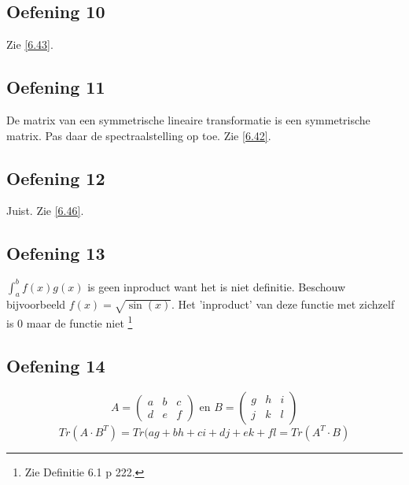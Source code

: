 \documentclass[lineaire_algebra_oplossingen.tex]{subfiles}
\begin{document}
\subsection{Oefening 10}
Zie \ref{6.43}.

\subsection{Oefening 11}
De matrix van een symmetrische lineaire transformatie is een symmetrische matrix. Pas daar de spectraalstelling op toe. Zie \ref{6.42}.

\subsection{Oefening 12}
Juist. Zie \ref{6.46}.

\subsection{Oefening 13}
$\int_a^bf(x)g(x)$ is geen inproduct want het is niet definitie. Beschouw bijvoorbeeld $f(x) = \sqrt{\sin(x)}$. Het 'inproduct' van deze functie met zichzelf is $0$ maar de functie niet \footnote{Zie Definitie 6.1 p 222.}

\subsection{Oefening 14}
\[
A = 
\begin{pmatrix}
a & b & c\\
d & e & f
\end{pmatrix}
\text{ en }
B = 
\begin{pmatrix}
g & h & i\\
j & k & l
\end{pmatrix}
\]
\[
Tr(A\cdot B^T) = 
Tr(
ag + bh + ci + dj + ek + fl
= Tr(A^T\cdot B)
\]
\end{document}
